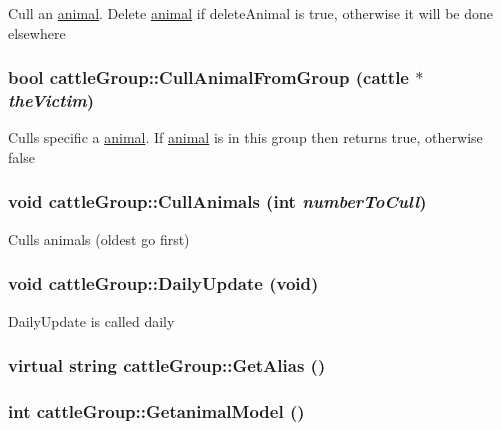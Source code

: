 Cull an \hyperlink{classanimal}{animal}. Delete \hyperlink{classanimal}{animal} if deleteAnimal is true, otherwise it will be done elsewhere \hypertarget{classcattle_group_a29c365d2a7e0aa8fa2d2c09936306839}{
\subsubsection[{CullAnimalFromGroup}]{\setlength{\rightskip}{0pt plus 5cm}bool cattleGroup::CullAnimalFromGroup ({\bf cattle} $\ast$ {\em theVictim})}}
\label{classcattle_group_a29c365d2a7e0aa8fa2d2c09936306839}
Culls specific a \hyperlink{classanimal}{animal}. If \hyperlink{classanimal}{animal} is in this group then returns true, otherwise false \hypertarget{classcattle_group_aef414c795b55a4b9add2402bc6cf0aaa}{
\subsubsection[{CullAnimals}]{\setlength{\rightskip}{0pt plus 5cm}void cattleGroup::CullAnimals (int {\em numberToCull})}}
\label{classcattle_group_aef414c795b55a4b9add2402bc6cf0aaa}
Culls animals (oldest go first) \hypertarget{classcattle_group_a50e5f5559c7f8ae9e0a4163ba0e6d602}{
\subsubsection[{DailyUpdate}]{\setlength{\rightskip}{0pt plus 5cm}void cattleGroup::DailyUpdate (void)}}
\label{classcattle_group_a50e5f5559c7f8ae9e0a4163ba0e6d602}
DailyUpdate is called daily \hypertarget{classcattle_group_abc9e83055bbfc774f2cd1900cff76c5b}{
\subsubsection[{GetAlias}]{\setlength{\rightskip}{0pt plus 5cm}virtual string cattleGroup::GetAlias ()}}
\label{classcattle_group_abc9e83055bbfc774f2cd1900cff76c5b}
\hypertarget{classcattle_group_a86e0db44ae65503c4288b8f0f00caa0d}{
\subsubsection[{GetanimalModel}]{\setlength{\rightskip}{0pt plus 5cm}int cattleGroup::GetanimalModel ()}}
